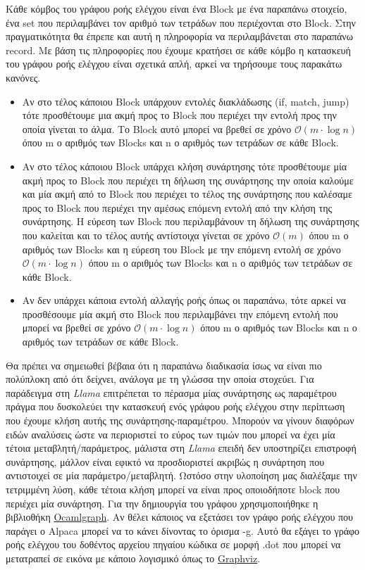 \documentclass[12pt]{article}
\newcommand{\Llama}{\textit{Llama }}
\begin{document}
Κάθε κόμβος του γράφου ροής ελέγχου είναι ένα Block με ένα παραπάνω στοιχείο, ένα set που περιλαμβάνει τον αριθμό των τετράδων που περιέχονται στο Block. Στην πραγματικότητα θα έπρεπε και αυτή η πληροφορία να περιλαμβάνεται στο παραπάνω record. Με βάση τις πληροφορίες που έχουμε κρατήσει σε κάθε κόμβο η κατασκευή του γράφου ροής ελέγχου είναι σχετικά απλή, αρκεί να τηρήσουμε τους παρακάτω κανόνες.
\begin{itemize}
\item Αν στο τέλος κάποιου Block υπάρχουν εντολές διακλάδωσης (if, match, jump) τότε προσθέτουμε μια ακμή προς το Block που περιέχει την εντολή προς την οποία γίνεται το άλμα. Το Block αυτό μπορεί να βρεθεί σε χρόνο $\mathcal{O}(m \cdot \log n)$ όπου m ο αριθμός των Blocks και n ο αριθμός των τετράδων σε κάθε Block.
\item Αν στο τέλος κάποιου Block υπάρχει κλήση συνάρτησης τότε προσθέτουμε μία ακμή προς το Block που περιέχει τη δήλωση της συνάρτησης την οποία καλούμε και μία ακμή από το Block που περιέχει το τέλος της συνάρτησης που καλέσαμε προς το Block που περιέχει την αμέσως επόμενη εντολή από την κλήση της συνάρτησης. Η εύρεση των Block που περιλαμβάνουν τη δήλωση της συνάρτησης που καλείται και το τέλος αυτής αντίστοιχα γίνεται σε χρόνο $\mathcal{O}(m)$ όπου m ο αριθμός των Blocks και η εύρεση του Block με την επόμενη εντολή σε χρόνο $\mathcal{O}(m \cdot \log n)$ όπου m ο αριθμός των Blocks και n ο αριθμός των τετράδων σε κάθε Block.
\item Αν δεν υπάρχει κάποια εντολή αλλαγής ροής όπως οι παραπάνω, τότε αρκεί να προσθέσουμε μία ακμή στο Block που περιλαμβάνει την επόμενη εντολή που μπορεί να βρεθεί σε χρόνο $\mathcal{O}(m \cdot \log n)$ όπου m ο αριθμός των Blocks και n ο αριθμός των τετράδων σε κάθε Block.
\end{itemize}
Θα πρέπει να σημειωθεί βέβαια ότι η παραπάνω διαδικασία ίσως να είναι πιο πολύπλοκη από ότι δείχνει, ανάλογα με τη γλώσσα την οποία στοχεύει. Για παράδειγμα στη \Llama επιτρέπεται το πέρασμα μίας συνάρτησης ως παραμέτρου πράγμα που δυσκολεύει την κατασκευή ενός γράφου ροής ελέγχου στην περίπτωση που έχουμε κλήση αυτής της συνάρτησης-παραμέτρου. Μπορούν να γίνουν διαφόρων ειδών αναλύσεις ώστε να περιοριστεί το εύρος των τιμών που μπορεί να έχει μία τέτοια μεταβλητή/παράμετρος, μάλιστα στη \Llama επειδή δεν υποστηρίζει επιστροφή συνάρτησης, μάλλον είναι εφικτό να προσδιοριστεί ακριβώς η συνάρτηση που αντιστοιχεί σε μία παράμετρο/μεταβλητή. Ωστόσο στην υλοποίηση μας διαλέξαμε την τετριμμένη λύση, κάθε τέτοια κλήση μπορεί να είναι προς οποιοδήποτε block που περιέχει μία συνάρτηση. 
Για την δημιουργία του γράφου χρησιμοποιήθηκε η βιβλιοθήκη \href{http://ocamlgraph.lri.fr}{Ocamlgraph}. Αν θέλει κάποιος να εξετάσει τον γράφο ροής ελέγχου που παράγει ο Alpaca μπορεί να το κάνει δίνοντας το όρισμα -g. Αυτό θα εξάγει το γράφο ροής ελέγχου του δοθέντος αρχείου πηγαίου κώδικα σε μορφή .dot που μπορεί να μετατραπεί σε εικόνα με κάποιο λογισμικό όπως το \href{http://graphviz.org}{Graphviz}. 
\end{document}
